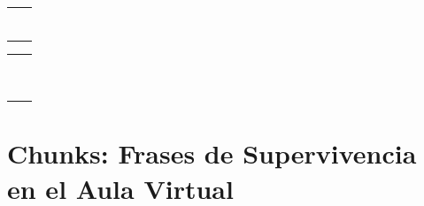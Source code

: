 \documentclass[12pt,a4paper]{article}
\begin{document}
\begin{multicols}{2}

\begin{cajachunk}
\begin{tabularx}{\linewidth}{@{} X l @{}}
\eng{Monday} & \esp{lunes} \\
\eng{Tuesday} & \esp{martes} \\
\eng{Wednesday} & \esp{miércoles} \\
\eng{Thursday} & \esp{jueves} \\
\eng{Friday} & \esp{viernes} \\
\eng{Saturday} & \esp{sábado} \\
\eng{Sunday} & \esp{domingo} \\
\end{tabularx}
\end{cajachunk}

\columnbreak

\begin{cajachunk}
\begin{tabularx}{\linewidth}{@{} X l @{}}
\eng{red} & \esp{rojo} \\
\eng{blue} & \esp{azul} \\
\eng{green} & \esp{verde} \\
\eng{yellow} & \esp{amarillo} \\
\eng{black} & \esp{negro} \\
\eng{white} & \esp{blanco} \\
\eng{orange} & \esp{naranja} \\
\eng{purple} & \esp{morado} \\
\eng{pink} & \esp{rosado} \\
\eng{brown} & \esp{marrón} \\
\end{tabularx}
\end{cajachunk}

\end{multicols}

\section{Chunks: Frases de Supervivencia en el Aula Virtual}
\end{document}
